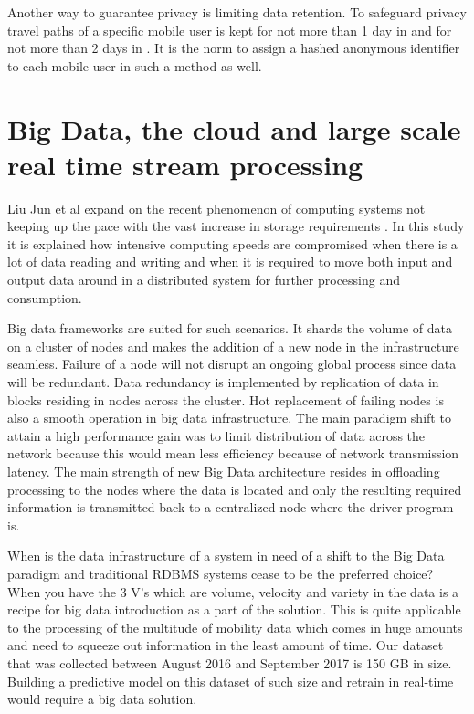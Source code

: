 \documentclass[12pt, a4paper]{report}
\theoremstyle{definition}
\theoremstyle{definition}%
\theoremstyle{definition}%
\theoremstyle{definition}%
\theoremstyle{definition}%
\theoremstyle{definition}%
\begin{document}
Another way to guarantee privacy is limiting data retention. To safeguard privacy travel paths of a specific mobile user is kept for not more than 1 day in \cite{Hoteit2014} and for not more than 2 days in \cite{Calabrese2013}. It is the norm to assign a hashed anonymous identifier to each mobile user in such a method as well.



\section{Big Data, the cloud and large scale real time stream processing} \label{background_big_data}

Liu Jun et al expand on the recent phenomenon of computing systems not keeping up the pace with the vast increase in storage requirements \cite{Liu2014}. In this study it is explained how intensive computing speeds are compromised when there is a lot of data reading and writing and when it is required to move both input and output data around in a distributed system for further processing and consumption. 

Big data frameworks are suited for such scenarios. It shards the volume of data on a cluster of nodes and makes the addition of a new node in the infrastructure seamless. Failure of a node will not disrupt an ongoing global process since data will be redundant. Data redundancy is implemented by replication of data in blocks residing in nodes across the cluster. Hot replacement of failing nodes is also a smooth operation in big data infrastructure. The main paradigm shift to attain a high performance gain was to limit distribution of data across the network because this would mean less efficiency because of network transmission latency. The main strength of new Big Data architecture resides in offloading processing to the nodes where the data is located and only the resulting required information is transmitted back to a centralized node where the driver program is\cite{inoubli2016experimental}.

When is the data infrastructure of a system in need of a shift to the Big Data paradigm and traditional RDBMS systems cease to be the preferred choice? When you have the 3 V's which are volume, velocity and variety in the data is a recipe for big data introduction as a part of the solution. This is quite applicable to the processing of the multitude of mobility data which comes in huge amounts and need to squeeze out information in the least amount of time. Our dataset that was collected between August 2016 and September 2017 is 150 GB in size. Building a predictive model on this dataset of such size and retrain in real-time would require a big data solution. 
\end{document}
